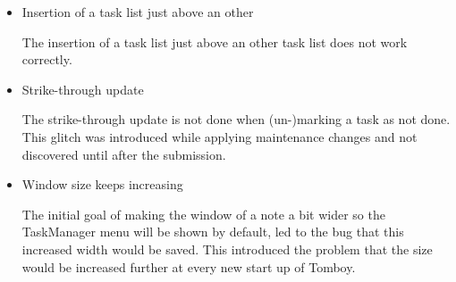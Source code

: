 \begin{itemize}
\item Insertion of a task list just above an other

  The insertion of a task list just above an other task list does not work correctly.

\item Strike-through update
  
  The strike-through update is not done when (un-)marking a task as not done.
  This glitch was introduced while applying maintenance changes and not discovered until after the submission.

\item Window size keeps increasing

  The initial goal of making the window of a note a bit wider so the TaskManager menu will be shown by default, led to the bug that this increased width would be saved. This introduced the problem that the size would be increased further at every new start up of Tomboy.

\end{itemize}